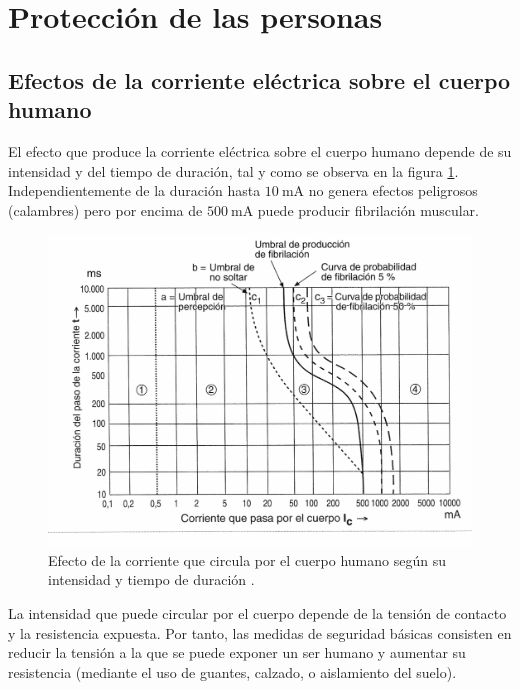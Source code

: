 \section{Protección de las personas}


\subsection{Efectos de la corriente eléctrica sobre el cuerpo humano}

El efecto que produce la corriente eléctrica sobre el cuerpo humano
depende de su intensidad y del tiempo de duración, tal y como se observa
en la figura \ref{fig:EfectoCorriente}. Independientemente de la
duración hasta $\SI{10}{\milli\ampere}$ no genera efectos peligrosos
(calambres) pero por encima de $\SI{500}{\milli\ampere}$ puede producir
fibrilación muscular.

%
\begin{figure}
\includegraphics[scale=0.23]{../figs/CurvaIntensidadContactoTiempo}

\caption[Efecto de la corriente que circula por el cuerpo humano]{Efecto de la corriente que circula por el cuerpo humano según su
intensidad y tiempo de duración \citep{PerezGabarda2000,PerezGabarda2000a}.\label{fig:EfectoCorriente}}

\end{figure}


La intensidad que puede circular por el cuerpo depende de la tensión
de contacto y la resistencia expuesta. Por tanto, las medidas de seguridad
básicas consisten en reducir la tensión a la que se puede exponer
un ser humano y aumentar su resistencia (mediante el uso de guantes,
calzado, o aislamiento del suelo). 

